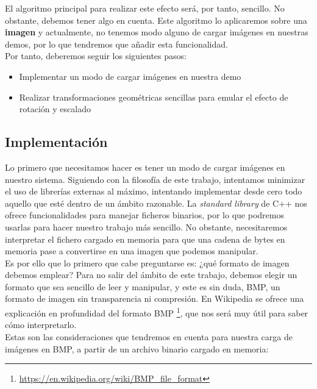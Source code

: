 El algoritmo principal para realizar este efecto será, por tanto, sencillo. No obstante, debemos tener algo en cuenta. Este algoritmo lo aplicaremos sobre una \textbf{imagen} y actualmente, no tenemos modo alguno de cargar imágenes en nuestras demos, por lo que tendremos que añadir esta funcionalidad.\\

Por tanto, deberemos seguir los siguientes pasos:
\begin{itemize}
	\item Implementar un modo de cargar imágenes en nuestra demo
	\item Realizar transformaciones geométricas sencillas para emular el efecto de rotación y escalado
\end{itemize}

\subsection{Implementación}

Lo primero que necesitamos hacer es tener un modo de cargar imágenes en nuestro sistema. Siguiendo con la filosofía de este trabajo, intentamos minimizar el uso de librerías externas al máximo, intentando implementar desde cero todo aquello que esté dentro de un ámbito razonable. La \emph{standard library} de C++ nos ofrece funcionalidades para manejar ficheros binarios, por lo que podremos usarlas para hacer nuestro trabajo más sencillo. No obstante, necesitaremos interpretar el fichero cargado en memoria para que una cadena de bytes en memoria pase a convertirse en una imagen que podemos manipular.\\

Es por ello que lo primero que cabe preguntarse es: ¿qué formato de imagen debemos emplear? Para no salir del ámbito de este trabajo, debemos elegir un formato que sea sencillo de leer y manipular, y este es sin duda, BMP, un formato de imagen sin transparencia ni compresión. En Wikipedia se ofrece una explicación en profundidad del formato BMP \footnote{\url{https://en.wikipedia.org/wiki/BMP_file_format}}, que nos será muy útil para saber cómo interpretarlo.\\

Estas son las consideraciones que tendremos en cuenta para nuestra carga de imágenes en BMP, a partir de un archivo binario cargado en memoria:

